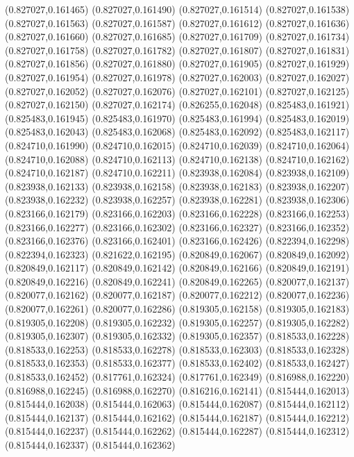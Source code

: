 (0.827027,0.161465)
(0.827027,0.161490)
(0.827027,0.161514)
(0.827027,0.161538)
(0.827027,0.161563)
(0.827027,0.161587)
(0.827027,0.161612)
(0.827027,0.161636)
(0.827027,0.161660)
(0.827027,0.161685)
(0.827027,0.161709)
(0.827027,0.161734)
(0.827027,0.161758)
(0.827027,0.161782)
(0.827027,0.161807)
(0.827027,0.161831)
(0.827027,0.161856)
(0.827027,0.161880)
(0.827027,0.161905)
(0.827027,0.161929)
(0.827027,0.161954)
(0.827027,0.161978)
(0.827027,0.162003)
(0.827027,0.162027)
(0.827027,0.162052)
(0.827027,0.162076)
(0.827027,0.162101)
(0.827027,0.162125)
(0.827027,0.162150)
(0.827027,0.162174)
(0.826255,0.162048)
(0.825483,0.161921)
(0.825483,0.161945)
(0.825483,0.161970)
(0.825483,0.161994)
(0.825483,0.162019)
(0.825483,0.162043)
(0.825483,0.162068)
(0.825483,0.162092)
(0.825483,0.162117)
(0.824710,0.161990)
(0.824710,0.162015)
(0.824710,0.162039)
(0.824710,0.162064)
(0.824710,0.162088)
(0.824710,0.162113)
(0.824710,0.162138)
(0.824710,0.162162)
(0.824710,0.162187)
(0.824710,0.162211)
(0.823938,0.162084)
(0.823938,0.162109)
(0.823938,0.162133)
(0.823938,0.162158)
(0.823938,0.162183)
(0.823938,0.162207)
(0.823938,0.162232)
(0.823938,0.162257)
(0.823938,0.162281)
(0.823938,0.162306)
(0.823166,0.162179)
(0.823166,0.162203)
(0.823166,0.162228)
(0.823166,0.162253)
(0.823166,0.162277)
(0.823166,0.162302)
(0.823166,0.162327)
(0.823166,0.162352)
(0.823166,0.162376)
(0.823166,0.162401)
(0.823166,0.162426)
(0.822394,0.162298)
(0.822394,0.162323)
(0.821622,0.162195)
(0.820849,0.162067)
(0.820849,0.162092)
(0.820849,0.162117)
(0.820849,0.162142)
(0.820849,0.162166)
(0.820849,0.162191)
(0.820849,0.162216)
(0.820849,0.162241)
(0.820849,0.162265)
(0.820077,0.162137)
(0.820077,0.162162)
(0.820077,0.162187)
(0.820077,0.162212)
(0.820077,0.162236)
(0.820077,0.162261)
(0.820077,0.162286)
(0.819305,0.162158)
(0.819305,0.162183)
(0.819305,0.162208)
(0.819305,0.162232)
(0.819305,0.162257)
(0.819305,0.162282)
(0.819305,0.162307)
(0.819305,0.162332)
(0.819305,0.162357)
(0.818533,0.162228)
(0.818533,0.162253)
(0.818533,0.162278)
(0.818533,0.162303)
(0.818533,0.162328)
(0.818533,0.162353)
(0.818533,0.162377)
(0.818533,0.162402)
(0.818533,0.162427)
(0.818533,0.162452)
(0.817761,0.162324)
(0.817761,0.162349)
(0.816988,0.162220)
(0.816988,0.162245)
(0.816988,0.162270)
(0.816216,0.162141)
(0.815444,0.162013)
(0.815444,0.162038)
(0.815444,0.162063)
(0.815444,0.162087)
(0.815444,0.162112)
(0.815444,0.162137)
(0.815444,0.162162)
(0.815444,0.162187)
(0.815444,0.162212)
(0.815444,0.162237)
(0.815444,0.162262)
(0.815444,0.162287)
(0.815444,0.162312)
(0.815444,0.162337)
(0.815444,0.162362)
